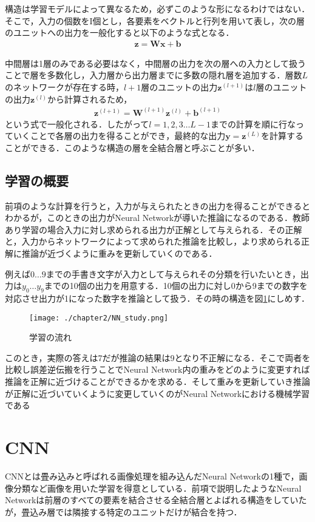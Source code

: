 構造は学習モデルによって異なるため，必ずこのような形になるわけではない．そこで，入力の個数をI個とし，各要素をベクトルと行列を用いて表し，次の層のユニットへの出力を一般化すると以下のような式となる．
\begin{align*}
\bm{z} = \bm{W}\bm{x} + \bm{b}
\end{align*}

中間層は1層のみである必要はなく，中間層の出力を次の層への入力として扱うことで層を多数化し，入力層から出力層までに多数の隠れ層を追加する．層数$L$のネットワークが存在する時，$l+1$層のユニットの出力$\bm{z}^{(l+1)}$は$l$層のユニットの出力$\bm{z}^{(l)}$から計算されるため，
\begin{align*}
\bm{z}^{(l+1)} = \bm{W}^{(l+1)}\bm{z}^{(l)} + \bm{b}^{(l+1)}
\end{align*}
という式で一般化される．したがって$l=1,2,3\ldots L-1$までの計算を順に行なっていくことで各層の出力を得ることができ，最終的な出力$\bm{y}=\bm{z}^{(L)}$を計算することができる．このような構造の層を全結合層と呼ぶことが多い．

\subsection{学習の概要}
前項のような計算を行うと，入力が与えられたときの出力を得ることができるとわかるが，このときの出力がNeural Networkが導いた推論になるのである．教師あり学習の場合入力に対し求められる出力が正解として与えられる．その正解と，入力からネットワークによって求められた推論を比較し，より求められる正解に推論が近づくように重みを更新していくのである．

例えば$0 \ldots 9$までの手書き文字が入力として与えられその分類を行いたいとき，出力は$y_0 \ldots y_9$までの10個の出力を用意する．10個の出力に対し0から9までの数字を対応させ出力が1になった数字を推論として扱う．その時の構造を図\ref{fig_study}にしめす．
\begin{figure}[]
  \begin{center}
    \texttt{[image: ./chapter2/NN\_study.png]}
    \caption{学習の流れ}
    \label{fig_study}
  \end{center}
\end{figure}

このとき，実際の答えは7だが推論の結果は9となり不正解になる．そこで両者を比較し誤差逆伝搬を行うことでNeural Network内の重みをどのように変更すれば推論を正解に近づけることができるかを求める．そして重みを更新していき推論が正解に近づいていくように変更していくのがNeural Networkにおける機械学習である

\section{CNN}
CNNとは畳み込みと呼ばれる画像処理を組み込んだNeural Networkの1種で，画像分類など画像を用いた学習を得意としている．前項で説明したようなNeural Networkは前層のすべての要素を結合させる全結合層とよばれる構造をしていたが，畳込み層では隣接する特定のユニットだけが結合を持つ．

